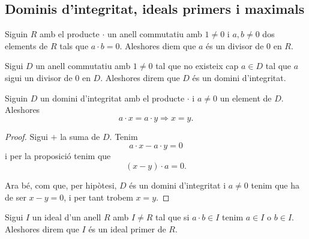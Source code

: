 \documentclass[../../Main.tex]{subfiles}
\begin{document}
	\subsection{Dominis d'integritat, ideals primers i maximals}
	\begin{definition}[Divisor de 0]
		\label{def:divisor de 0 en un anell}
		Siguin \(R\) amb el producte \(\cdot\) un anell commutatiu amb \(1\neq0\) i \(a,b\neq0\) dos elements de \(R\) tals que \(a\cdot b=0\). Aleshores diem que \(a\) és un divisor de 0 en \(R\).
	\end{definition}
	\begin{definition}
		\label{def:domini d'integritat}
		\label{def:DI}
		Sigui \(D\) un anell commutatiu amb \(1\neq0\) tal que no existeix cap \(a\in D\) tal que \(a\) sigui un divisor de \(0\) en \(D\). Aleshores direm que \(D\) és un domini d'integritat.
	\end{definition}
	\begin{proposition}
		\label{prop:podem tatxar pels costats en DI}
		Siguin \(D\) un domini d'integritat amb el producte \(\cdot\) i \(a\neq0\) un element de \(D\). Aleshores
		\[a\cdot x=a\cdot y\Longrightarrow x=y.\]
		\begin{proof}
			Sigui \(+\) la suma de \(D\). Tenim
			\[a\cdot x-a\cdot y=0\]
			i per la proposició  tenim que
			\[(x-y)\cdot a=0.\]
			
			Ara bé, com que, per hipòtesi, \(D\) és un domini d'integritat i \(a\neq0\) tenim que ha de ser \(x-y=0\), i per tant trobem \(x=y\).
		\end{proof}
	\end{proposition}
	\begin{definition}
		\label{def:ideal primer}
		Sigui \(I\) un ideal d'un anell \(R\) amb \(I\neq R\) tal que si \(a\cdot b\in I\) tenim \(a\in I\) o \(b\in I\). Aleshores direm que \(I\) és un ideal primer de \(R\).
	\end{definition}
\end{document}
